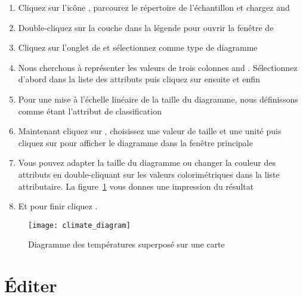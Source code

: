 \begin{enumerate}
\item Cliquez sur l'icône , parcourez le répertoire de l'échantillon \qg et chargez  and 
\item Double-cliquez sur la couche  dans la légende pour ouvrir la fenêtre de\\ 
\item Cliquez sur l'onglet de  et sélectionnez  comme type de diagramme
\item Nous cherchons à représenter les valeurs de trois colonnes  and . Sélectionnez d'abord  dans la liste des attributs puis cliquez sur  ensuite  et enfin 
\item Pour une mise à l'échelle linéaire de la taille du diagramme, nous définissons  comme étant l'attribut de classification
\item Maintenant cliquez sur , choisissez une valeur de taille et une unité puis cliquez sur  pour afficher le diagramme dans la fenêtre principale
\item Vous pouvez adapter la taille du diagramme ou changer la couleur des attributs en double-cliquant sur les valeurs colorimétriques dans la liste attributaire. La figure~\ref{fig:climatediagram} vous donnes une impression du résultat
\item Et pour finir cliquez .
\end{enumerate}

\begin{figure}[ht]
   \begin{center}
   \texttt{[image: climate\_diagram]}
   \caption{Diagramme des températures superposé sur une carte \nixcaption}\label{fig:climatediagram}
\end{center}
\end{figure}

\section{Éditer}

